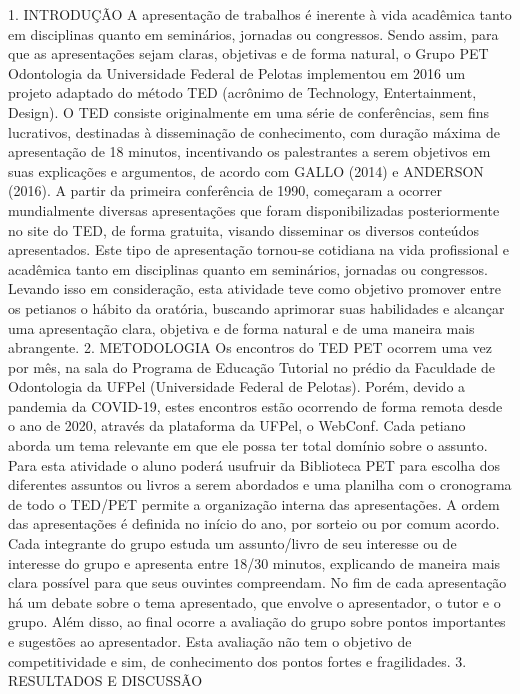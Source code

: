 1. INTRODUÇÃO
A apresentação de trabalhos é inerente à vida acadêmica tanto em disciplinas quanto em
seminários, jornadas ou congressos. Sendo assim, para que as apresentações sejam claras, objetivas
e de forma natural, o Grupo PET Odontologia da Universidade Federal de Pelotas implementou
em 2016 um projeto adaptado do método TED (acrônimo de Technology, Entertainment, Design).
O TED consiste originalmente em uma série de conferências, sem fins lucrativos, destinadas à
disseminação de conhecimento, com duração máxima de apresentação de 18 minutos,
incentivando os palestrantes a serem objetivos em suas explicações e argumentos, de acordo com
GALLO (2014) e ANDERSON (2016).
A partir da primeira conferência de 1990, começaram a ocorrer mundialmente diversas
apresentações que foram disponibilizadas posteriormente no site do TED, de forma gratuita,
visando disseminar os diversos conteúdos apresentados. Este tipo de apresentação tornou-se
cotidiana na vida profissional e acadêmica tanto em disciplinas quanto em seminários, jornadas ou
congressos.
Levando isso em consideração, esta atividade teve como objetivo promover entre os
petianos o hábito da oratória, buscando aprimorar suas habilidades e alcançar uma apresentação
clara, objetiva e de forma natural e de uma maneira mais abrangente.
2. METODOLOGIA
Os encontros do TED PET ocorrem uma vez por mês, na sala do Programa de Educação
Tutorial no prédio da Faculdade de Odontologia da UFPel (Universidade Federal de Pelotas).
Porém, devido a pandemia da COVID-19, estes encontros estão ocorrendo de forma remota desde
o ano de 2020, através da plataforma da UFPel, o WebConf. Cada petiano aborda um tema
relevante em que ele possa ter total domínio sobre o assunto. Para esta atividade o aluno poderá
usufruir da Biblioteca PET para escolha dos diferentes assuntos ou livros a serem abordados e uma
planilha com o cronograma de todo o TED/PET permite a organização interna das apresentações. A ordem das apresentações é definida no início do ano, por sorteio ou por comum acordo.
Cada integrante do grupo estuda um assunto/livro de seu interesse ou de interesse do grupo e
apresenta entre 18/30 minutos, explicando de maneira mais clara possível para que seus ouvintes
compreendam. No fim de cada apresentação há um debate sobre o tema apresentado, que envolve
o apresentador, o tutor e o grupo. Além disso, ao final ocorre a avaliação do grupo sobre pontos
importantes e sugestões ao apresentador. Esta avaliação não tem o objetivo de competitividade e
sim, de conhecimento dos pontos fortes e fragilidades.
3. RESULTADOS E DISCUSSÃO
